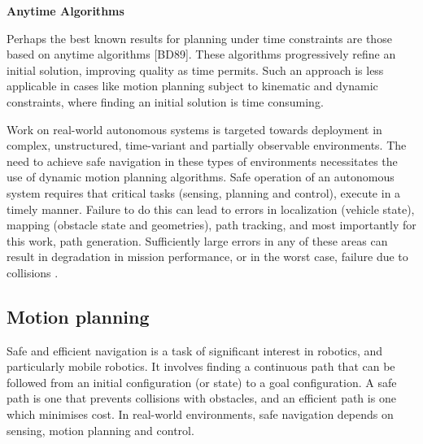 

\begin{framed}
\theoremstyle{remark}
\begin{remark}{\textbf{Anytime Algorithms}}
 
Perhaps the best known results for planning under time constraints are those based on anytime algorithms [BD89]. 
These algorithms progressively refine an initial solution, improving
quality as time permits. Such an approach is less applicable in cases like motion planning subject 
to kinematic and dynamic constraints, where finding an initial solution is time consuming.
\end{remark}
\end{framed}


Work on real-world autonomous systems is targeted towards deployment in complex, unstructured, 
time-variant and partially observable environments. The need to achieve safe navigation in these types of environments 
necessitates the use of dynamic motion planning algorithms.
Safe operation of an autonomous system requires that critical tasks (sensing, planning and
control), execute in a timely manner. Failure to do this can lead to errors in localization (vehicle
state), mapping (obstacle state and geometries), path tracking, and most importantly for this
work, path generation. Sufficiently large errors in any of these areas can result in degradation
in mission performance, or in the worst case, failure due to collisions \cite{Walker2011}.

\subsection{Motion planning}
\label{motion_planning}

Safe and efficient navigation is a task of significant interest in robotics, and particularly
mobile robotics. It involves finding a continuous path that can be followed from an initial
configuration (or state) to a goal configuration. A safe path is one that prevents collisions with
obstacles, and an efficient path is one which minimises cost. In real-world environments, safe
navigation depends on sensing, motion planning and control.


